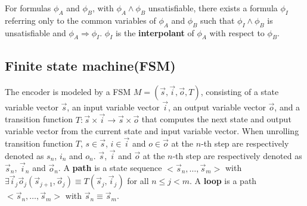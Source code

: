 \documentclass[conference]{IEEEtran}
\begin{document}
For formulas $\phi_A$ and $\phi_B$,
with $\phi_A\wedge \phi_B$ unsatisfiable,
there exists a formula $\phi_I$ referring only
to the common variables of $\phi_A$ and $\phi_B$ such that $\phi_I\wedge \phi_B$ is unsatisfiable 
and $\phi_A\Rightarrow \phi_I$.
$\phi_I$ is the \textbf{interpolant} \cite{Craig} of $\phi_A$ with respect to $\phi_B$.




\subsection{Finite state machine(FSM)}\label{subsec_fsm}



The encoder is modeled by a FSM $M=(\vec{s},\vec{i},\vec{o},T)$,
consisting of a state variable vector $\vec{s}$,
an input variable vector $\vec{i}$,
an output variable vector $\vec{o}$,
and a transition function $T: \vec{s}\times \vec{i}\to \vec{s}\times \vec{o}$ 
that computes the next state and output variable vector from the current state and input variable vector.
When unrolling transition function $T$,
$s\in\vec{s}$,  $i\in\vec{i}$ and  $o\in\vec{o}$ at the $n$-th step 
are respectively denoted as $s_n$, $i_n$ and $o_n$.
$\vec{s}$, $\vec{i}$ and $\vec{o}$ at the $n$-th step are respectively denoted as $\vec{s}_n$, $\vec{i}_n$ and $\vec{o}_n$.
A \textbf{path} is a state sequence $<\vec{s}_n,\dots,\vec{s}_m>$ with $\exists \vec{i}_j\vec{o}_j (\vec{s}_{j+1},\vec{o}_j)\equiv T(\vec{s}_j,\vec{i}_j)$ for all $n\le j< m$.
A \textbf{loop} is a path $<\vec{s}_n,\dots,\vec{s}_m>$ with $\vec{s}_n\equiv \vec{s}_m$.
\end{document}
